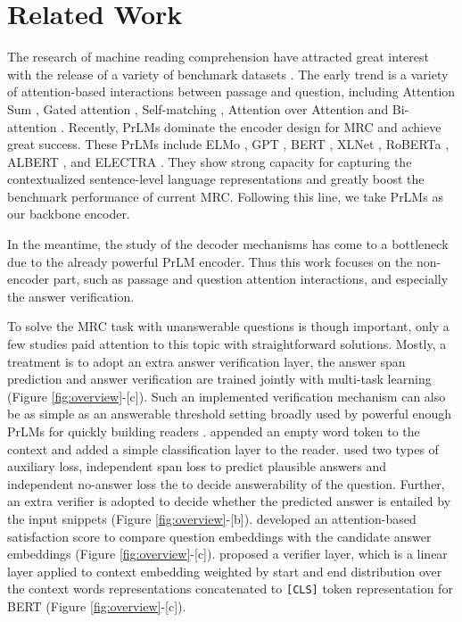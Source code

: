 \documentclass[letterpaper]{article} \usepackage{aaai21}  \usepackage{times}  \usepackage{helvet} \usepackage{courier}  \usepackage[hyphens]{url}  \usepackage{graphicx}
\begin{document}
\section{Related Work}
The research of machine reading comprehension have attracted great interest with the release of a variety of benchmark datasets \cite{hill2015goldilocks,hermann2015teaching,Rajpurkar2016SQuAD,Joshi2017TriviaQA,Rajpurkar2018Know,lai2017race}. The early trend is a variety of attention-based interactions between passage and question, including Attention Sum \cite{kadlec2016text}, Gated attention \cite{Dhingra2017Gated}, Self-matching  \cite{Wang2017Gated}, Attention over Attention \cite{Cui2017Attention} and Bi-attention  \cite{Seo2016Bidirectional}.
Recently, PrLMs dominate the encoder design for MRC and achieve great success. These PrLMs include ELMo \cite{peters2018deep}, GPT \cite{radford2018improving}, BERT \cite{devlin2018bert}, XLNet \cite{yang2019xlnet},  RoBERTa \cite{liu2019roberta}, ALBERT \cite{Lan2020ALBERT}, and ELECTRA \cite{clark2019electra}. They show strong capacity for capturing the contextualized sentence-level language representations and greatly boost the benchmark performance of current MRC. 
Following this line, we take PrLMs as our backbone encoder.


In the meantime, the study of the decoder mechanisms has come to a bottleneck due to the already powerful PrLM encoder. Thus this work focuses on the non-encoder part, such as passage and question attention interactions, and especially the answer verification. 

To solve the MRC task with unanswerable questions is though important, only a few studies paid attention to this topic with straightforward solutions.
Mostly, a treatment is to adopt an extra answer verification layer, the answer span prediction and answer verification are trained jointly with multi-task learning (Figure \ref{fig:overview}-[c]). Such an implemented verification mechanism can also be as simple as an answerable threshold setting broadly used by powerful enough PrLMs for quickly building readers \cite{devlin2018bert,zhang2019semantics}.
\citeauthor{liu2018stochastic}  appended an empty word token to the context and added a simple classification layer to the reader. \citeauthor{hu2019read}  used two types of auxiliary loss, independent span loss to predict plausible answers and independent no-answer loss the to decide answerability of the question. Further, an extra verifier is adopted to decide whether the predicted answer is entailed by the input snippets (Figure \ref{fig:overview}-[b]). 
\citeauthor{back2020neurquri}  developed an attention-based satisfaction score to compare question embeddings with the candidate answer embeddings (Figure \ref{fig:overview}-[c]). \citeauthor{zhang2019sg}  proposed a verifier layer, which is 
a linear layer applied to context embedding weighted by start and end distribution over the context words representations concatenated to \texttt{[CLS]} token representation for BERT (Figure \ref{fig:overview}-[c]). 
\end{document}
